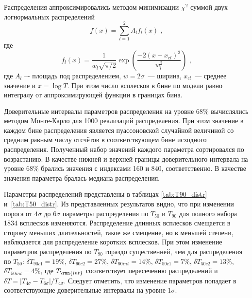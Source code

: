 Распределения  аппроксимировались методом минимизации $\chi^2$ суммой двух логнормальных распределений
\begin{equation}
f(x) = \sum_{l=1}^{2} A_l f_l(x) \mbox{ ,}
\end{equation}
где
\begin{equation}
f_l(x) = \frac{1}{w_l \sqrt{\pi/2}} \exp\left(\frac{-2(x-x_{cl})^2}{w_l^2}\right) \mbox{ ,}
\end{equation}
где $A_l$ –- площадь под распределением, $w=2\sigma$~--- ширина, $x_{cl}$~--- среднее значение и 
$x=\log T$. При этом число всплесков в бине по модели равно  интегралу от аппроксимирующей функции в границах бина. 

Доверительные интервалы параметров распределения на уровне 68\% вычислялись 
методом Mонте-Карло для 1000 реализаций распределения. При этом значение в каждом 
бине распределения является пуассоновской случайной величиной со средним равным 
числу отсчётов в соответствующем бине исходного распределения. Полученный набор 
значений каждого параметра сортировался по возрастанию. В качестве нижней и верхней 
границы доверительного интервала на уровне 68\% брались значения с индексами 160 и 840, 
соответственно. В качестве значения параметра бралась медиана распределения.

Параметры распределений представлены в таблицах \ref{tab:T90_distr} и~\ref{tab:T50_distr}. 
Из представленных результатов видно, что при изменении порога от $4\sigma$ до $6\sigma$ 
параметры распределения по $T_{50}$ и $T_{90}$ для полного набора 1834 всплесков изменяются. 
Распределение длинных всплесков смещается в сторону меньших длительностей, такое же смещение, 
но в меньшей степени, наблюдается для распределение коротких всплесков. 
При этом изменение параметров распределения по $T_{90}$ гораздо существенней, 
чем для распределения по $T_{50}$: 
$\delta T_{90c1} = 19$\%, $\delta T_{90c2} = 27$\%, $\delta T_{90int} = 14$\%, 
$\delta T_{50c1} = 7$\%, $\delta T_{50c2} = 13$\%, $\delta T_{50int} = 4$\%, 
где $T_{\rmn{int}}$ соответствует пересечению распределений и 
$\delta T =|T_{4\sigma}-T_{6\sigma}| / T_{4\sigma}$. 
Следует отметить, что изменение параметров попадает в соответствующие доверительные интервалы на уровне $1\sigma$. 

